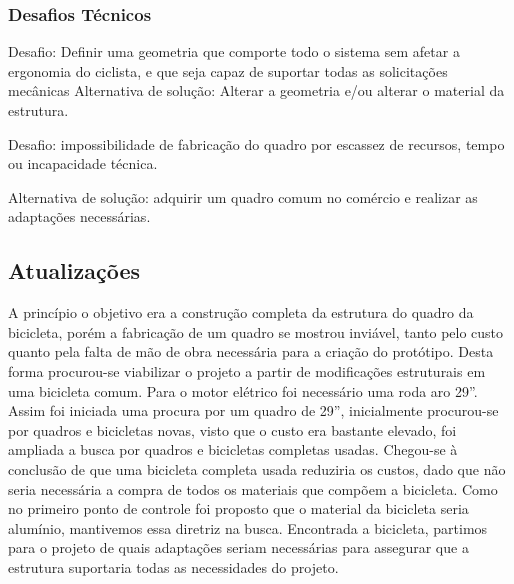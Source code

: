 \clearpage

	
	
	
	\subsubsection{Desafios Técnicos}
	Desafio: Definir uma geometria que comporte todo o sistema sem afetar a ergonomia do ciclista, e que seja capaz de suportar todas as solicitações mecânicas
	Alternativa de solução: Alterar a geometria e/ou alterar o material da estrutura.

	Desafio: impossibilidade de fabricação do quadro  por escassez de recursos, tempo ou incapacidade técnica.

	Alternativa de solução: adquirir um quadro comum no comércio e realizar as adaptações necessárias.

	\subsection{Atualizações}
	A princípio o objetivo era a construção completa da estrutura do quadro da bicicleta, porém a fabricação de um quadro se mostrou inviável, tanto pelo custo quanto pela falta de mão de obra necessária para a criação do protótipo. Desta forma procurou-se viabilizar o projeto a partir de modificações estruturais em uma bicicleta comum. 
	Para o motor elétrico foi necessário uma roda aro 29”. Assim foi iniciada uma procura por um quadro de 29”, inicialmente procurou-se por quadros e bicicletas novas, visto que o custo era bastante elevado, foi ampliada a busca por quadros e bicicletas completas usadas. Chegou-se à conclusão de que uma bicicleta completa usada reduziria os custos, dado que não seria necessária a compra de todos os materiais que compõem a bicicleta. 
	Como no primeiro ponto de controle foi proposto que o material da bicicleta seria alumínio, mantivemos essa diretriz na busca. Encontrada a bicicleta, partimos para o projeto de quais adaptações seriam necessárias para assegurar que a estrutura suportaria todas as necessidades do projeto.
	
